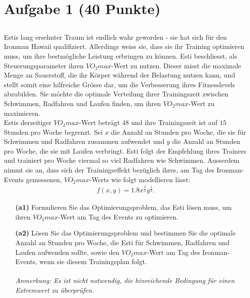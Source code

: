 \vspace{1cm}
\renewcommand{\labelenumi}{\theenumi.}
\section*{Aufgabe 1 (40 Punkte)}
\vspace{0.4cm}
\subsection*{}
Estis lang ersehnter Traum ist endlich wahr geworden
- 
sie hat sich für den Ironman Hawaii qualifiziert.
Allerdings weiss sie, dass sie ihr Training optimieren muss, um ihre bestmögliche Leistung erbringen zu können.
Esti beschliesst, als Steuerungsparameter ihren $VO_2max$-Wert zu nutzen.
Dieser misst die maximale Menge an Sauerstoff, die ihr Körper während der Belastung nutzen kann, und stellt somit eine hilfreiche Grösse dar, um die Verbesserung ihres Fitnesslevels abzubilden.
Sie möchte die optimale Verteilung ihrer Trainingszeit zwischen
Schwimmen, Radfahren und Laufen finden, um ihren $VO_2max$-Wert zu maximieren.\\
Estis derzeitiger $VO_2max$-Wert beträgt $48$ und ihre Trainingszeit ist auf $15$ Stunden pro Woche begrenzt.
Sei $x$ die Anzahl an Stunden pro Woche, die sie für Schwimmen und Radfahren zusammen aufwendet und $y$ die Anzahl an Stunden pro Woche, die sie mit Laufen verbringt.
Esti folgt der Empfehlung ihres Trainers und trainiert pro Woche viermal so viel Radfahren wie Schwimmen. Ausserdem nimmt sie an, dass sich der Trainingseffekt bezüglich ihres, am Tag des Ironman-Events gemessenen, $VO_2max$-Werts wie folgt modellieren lässt:
\begin{align*}
	f(x,y) = 1.8 x^{\frac{2}{3}} y^{\frac{1}{3}}.
\end{align*}
\begin{enumerate}
	\item[\textbf{(a1)}]
	Formulieren Sie das Optimierungsproblem, das Esti lösen muss, um ihren $VO_2max$-Wert am Tag des Events zu optimieren.
	\item[\textbf{(a2)}] 
	Lösen Sie das Optimierungsproblem und bestimmen Sie die optimale Anzahl an Stunden pro Woche, die Esti für Schwimmen, Radfahren und Laufen aufwenden sollte, sowie den $VO_2max$-Wert am Tag des Ironman-Events, wenn sie diesem Trainingsplan folgt.\\
	\\
	\textit{Anmerkung: Es ist nicht notwendig, die hinreichende Bedingung für einen Extremwert zu überprüfen.}
\end{enumerate}
 
